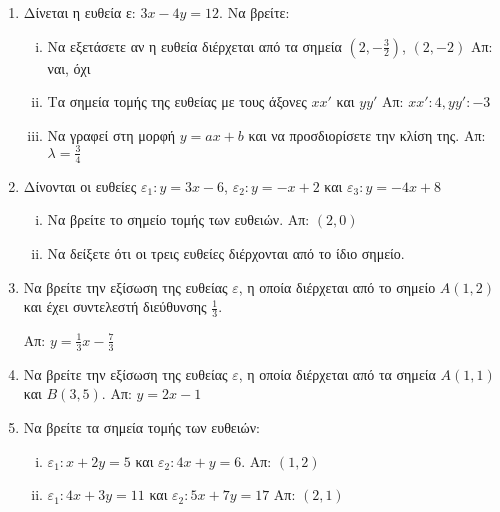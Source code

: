 


\pagestyle{askhseis}
\geometry{top=2cm,left=1.5cm,right=1.5cm}



\setcounter{chapter}{1}

\begin{center}
  \minibox{\large\bfseries \textcolor{Col1}{Ευθείες}}
\end{center}

\vspace{\baselineskip}

\begin{enumerate}
  \item  Δίνεται η ευθεία ε:  $ 3x - 4y = 12 $.  Να βρείτε:
    \begin{enumerate}[i)]
      \item Να εξετάσετε αν η ευθεία διέρχεται από τα σημεία $\left(2,- \frac{3}{2}
        \right)$, $ (2,-2) $ \hfill Απ:  ναι, όχι 
      \item  Τα σημεία τομής της ευθείας με τους άξονες  $ xx' $  και  $ yy' $ \hfill Απ:
        $ xx': 4, yy':-3 $ 
      \item Να γραφεί στη μορφή $ y=ax+b $ και να προσδιορίσετε την κλίση της. \hfill
        Απ: $ \lambda = \frac{3}{4} $ 
    \end{enumerate}

  \item  Δίνονται οι ευθείες 
    $ \varepsilon_1: y = 3x-6 $, $ \varepsilon_2: y = -x+2 $  και 
    $ \varepsilon_3:   y = -4x+8 $
    \begin{enumerate}[i)]
      \item  Να βρείτε το σημείο τομής των ευθειών.  \hfill Απ: $ (2,0) $
      \item  Να δείξετε ότι οι τρεις ευθείες διέρχονται από το ίδιο σημείο.
    \end{enumerate}

  \item  Να βρείτε την εξίσωση της ευθείας  $ \varepsilon $,  η οποία διέρχεται 
    από το σημείο  $ A(1,2) $ και έχει συντελεστή διεύθυνσης  $ \frac{1}{3} $.

    \hfill Απ: $ y = \frac{1}{3} x - \frac{7}{3} $ 

  \item  Να βρείτε την εξίσωση της ευθείας  $\varepsilon$, η οποία διέρχεται 
    από τα σημεία  $ A(1,1) $  και  $ B(3,5) $. 
    \hfill Απ: $ y=2x-1 $ 

  \item  Να βρείτε τα  σημεία τομής των ευθειών:
    \begin{enumerate}[i)]
      \item $ \varepsilon_{1}: x + 2y = 5 $   και  $\varepsilon_{2}: 4x + y = 6 $.
        \hfill Απ: $ (1,2) $ 
      \item $ \varepsilon_{1}: 4x+3y=11 $ και  $ \varepsilon_{2}: 5x+7y=17 $ \hfill Απ: $
        (2,1) $ 
    \end{enumerate}



\end{enumerate}
